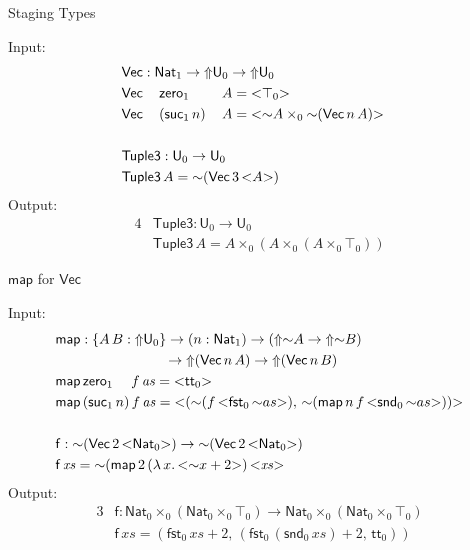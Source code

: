 \documentclass[dvipsnames]{beamer}
\renewcommand{\mit}[1]{\mathit{#1}}
\newcommand{\msf}[1]{\mathsf{#1}}
\newcommand{\Lift}{{\Uparrow}}
\newcommand{\spl}{{\sim}}
\newcommand{\qut}[1]{{<}#1{>}}
\newcommand{\U}{\msf{U}}
\newcommand{\Nat}{\msf{Nat}}
\newcommand{\zero}{\msf{zero}}
\newcommand{\suc}{\msf{suc}}
\renewcommand{\tt}{\msf{tt}}
\newcommand{\fst}{\msf{fst}}
\newcommand{\snd}{\msf{snd}}
\theoremstyle{remark}
\newcommand{\Vect}{\msf{Vec}}
\begin{document}
\begin{frame}{Staging Types}

Input:
\begin{alignat*}{4}
  & \rlap{$\Vect : \Nat_1 \to \Lift \U_0 \to \Lift \U_0$}\\
  & \Vect\,&&\zero_1    \,&&A = \qut{\top_0}\\
  & \Vect\,&&(\suc_1\,n)\,&&A = \qut{\spl A \times_0 \spl(\Vect\,n\,A)}\\
  & \\
  & \rlap{$\msf{Tuple3} : \U_0 \to \U_0$} \\
  & \rlap{$\msf{Tuple3}\,A = \spl(\Vect\,3\,\qut{A})$}
\end{alignat*}
\pause
Output:
\begin{alignat*}{4}
  &\msf{Tuple3} : \U_0 \to \U_0 \\
  &\msf{Tuple3}\,A = A \times_0 (A \times_0 (A \times_0 \top_0))
\end{alignat*}

\end{frame}

\begin{frame}{$\msf{map}$ for $\Vect$}

Input:
\begin{alignat*}{3}
  &\msf{map} : \{A\,B : \Lift \U_0\} \to
  (n : \Nat_1) \to (\Lift\spl A \to \Lift\spl B) \\
  & \hspace{7.8em} \to \Lift(\Vect\,n\,A) \to \Lift(\Vect\,n\,B)\\
  &\msf{map}\,\zero_1\hspace{1.3em}f\,\mit{as} = \qut{\tt_0} \\
  &\msf{map}\,(\suc_1\,n)\,f\,\mit{as} =
    \qut{(\spl(f\,\qut{\fst_0\,\spl as}),\,\spl(\msf{map}\,n\,f\,\qut{\snd_0\,\spl as}))} \\
  & \\
  & \msf{f} : \spl(\Vect\,2\,\qut{\Nat_0}) \to \spl(\Vect\,2\,\qut{\Nat_0}) \\
  & \msf{f}\,\mit{xs} = \spl(\msf{map}\,2\,(\lambda\,x.\,\qut{\spl x + 2})\,\qut{\mit{xs}}
\end{alignat*}
\pause
Output:
\begin{alignat*}{3}
  & \msf{f} : \Nat_0 \times_0 (\Nat_0 \times_0 \top_0) \to \Nat_0 \times_0 (\Nat_0 \times_0 \top_0) \\
  & \msf{f}\,\mit{xs} = (\fst_0\,\mit{xs} + 2,\,(\fst_0\,(\snd_0\,\mit{xs}) + 2,\,\tt_0))
\end{alignat*}

\end{frame}
\end{document}
